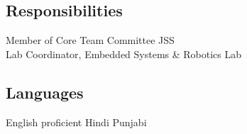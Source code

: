 \documentclass[]{deedy-resume-openfont}
\begin{document}
\begin{minipage}[t]{0.33\textwidth}
\subsection{Responsibilities}
Member of Core Team Committee JSS\\
Lab Coordinator, Embedded Systems \& Robotics Lab
\sectionsep

\subsection{Languages}
English proficient \textbullet{} Hindi \textbullet{} Punjabi \\

\sectionsep

%
%

\end{minipage} 
\hfill
\end{document}
